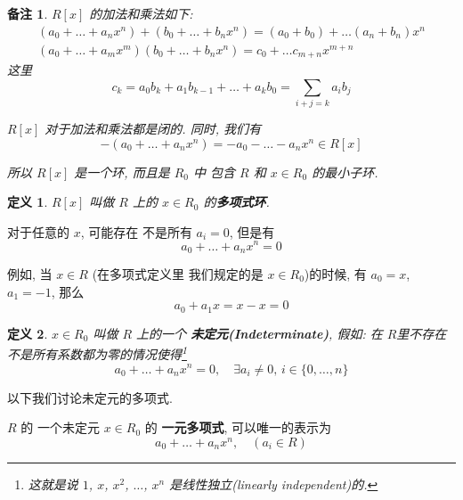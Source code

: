 \documentclass[utf8]{ctexbook}
\newtheorem{definition}{定义}[section]
\newtheorem{memo}{备注}[section]
\begin{document}
\begin{memo}
$R[x]$ 的加法和乘法如下:
\begin{align*}
(a_0 + \ldots + a_n x^n) + (b_0 + \ldots + b_n x^n) = (a_0 + b_0) + \ldots (a_n + b_n) x^n \\
(a_0 + \ldots + a_m x^m)  (b_0 + \ldots + b_n x^n) = c_0 + \ldots c_{m+n} x^{m+n} 
\end{align*}
这里
\begin{equation}
c_k = a_0 b_k + a_1 b_{k-1} + \ldots + a_k b_0 = \sum_{i+j = k} a_i b_j
\end{equation}

$R[x]$ 对于加法和乘法都是闭的. 同时, 我们有
\begin{equation}
- (a_0 + \ldots + a_n x^n)  = - a_0 - \ldots - a_n x^n \in R[x]  
\end{equation}

所以 $R[x]$ 是一个环, 而且是 $R_0$ 中 包含 $R$ 和 $x \in R_0$ 的最小子环.

\end{memo}

\begin{definition}
$R[x]$ 叫做 $R$ 上的 $x \in R_0$ 的\textbf{多项式环}.
\end{definition}

对于任意的 $x$, 可能存在 不是所有 $a_i = 0$, 但是有
\begin{equation}
a_0 + \ldots + a_n x^n = 0 \nonumber
\end{equation} 

例如, 当 $x \in R$ (在多项式定义里 我们规定的是 $x \in R_0$)的时候, 有 $a_0 = x$, $a_1 =-1$, 那么
\begin{equation}
a_0 + a_1 x = x - x = 0 \nonumber
\end{equation} 

\begin{definition}
$x \in R_0$ 叫做 $R$ 上的一个 \textbf{未定元(Indeterminate)}, 假如: 在 $R$里不存在 不是所有系数都为零的情况使得\footnote{这就是说 $1$, $x$, $x^2$, $\ldots$, $x^n$ 是线性独立(linearly independent)的.}
\begin{equation}
a_0 + \ldots + a_n x^n = 0, \quad \exists a_i \neq 0 ,\, i \in\{ 0, \ldots, n \} \nonumber
\end{equation}

\end{definition}

以下我们讨论未定元的多项式.

$R$ 的 一个未定元 $x \in R_0$ 的 \textbf{一元多项式}, 可以唯一的表示为
\begin{equation}
a_0 + \ldots + a_n x^n, \quad (a_i \in R) \nonumber
\end{equation}
\end{document}
